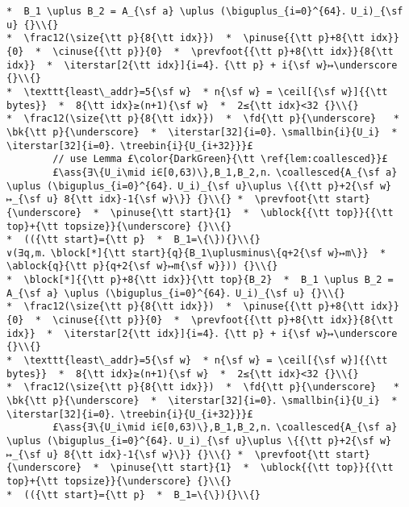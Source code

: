 \documentclass[10pt,twoside]{report}
\makeatletter
\newcommand{\ml}[2][t]{\mbox{\mdseries\begin{tabular}[#1]{@{}L@{}}#2\end{tabular}}}
\newcommand{\ass}[1]{\ensuremath{{\color{blue}\left\{\ml[c]{#1}\right\}}}}
\renewcommand{\ceil}[2][]{\left\lceil{#2}\right\rceil_{#1}}
\newcommand{\iterstar}[2][]{\text{\LARGE $*$}^{#1}_{#2}}
\makeatother
\begin{document}
\begin{lstlisting}
*  B_1 \uplus B_2 = A_{\sf a} \uplus (\biguplus_{i=0}^{64}．U_i)_{\sf u} {}\\{}
*  \frac12(\size{\tt p}{8{\tt idx}})  *  \pinuse{{\tt p}+8{\tt idx}}{0}  *  \cinuse{{\tt p}}{0}  *  \prevfoot{{\tt p}+8{\tt idx}}{8{\tt idx}}  *  \iterstar[2{\tt idx}]{i=4}．{\tt p} + i{\sf w}↦\underscore {}\\{}
*  \texttt{least\_addr}=5{\sf w}  * n{\sf w} = \ceil[{\sf w}]{{\tt bytes}}  *  8{\tt idx}≥(n+1){\sf w}  *  2≤{\tt idx}<32 {}\\{}
*  \frac12(\size{\tt p}{8{\tt idx}})  *  \fd{\tt p}{\underscore}   *  \bk{\tt p}{\underscore}  *  \iterstar[32]{i=0}．\smallbin{i}{U_i}  *  \iterstar[32]{i=0}．\treebin{i}{U_{i+32}}}£
        // use Lemma £\color{DarkGreen}{\tt \ref{lem:coallesced}}£ 
        £\ass{∃\{U_i\mid i∈[0,63)\},B_1,B_2,n．\coallesced{A_{\sf a} \uplus (\biguplus_{i=0}^{64}．U_i)_{\sf u}\uplus \{{\tt p}+2{\sf w}↦_{\sf u} 8{\tt idx}-1{\sf w}\}} {}\\{} *  \prevfoot{\tt start}{\underscore}  *  \pinuse{\tt start}{1}  *  \ublock{{\tt top}}{{\tt top}+{\tt topsize}}{\underscore} {}\\{}
*  (({\tt start}={\tt p}  *  B_1=\{\}){}\\{}
∨(∃q,m．\block[*]{\tt start}{q}{B_1\uplusminus\{q+2{\sf w}↦m\}}  *  \ablock{q}{\tt p}{q+2{\sf w}↦m{\sf w}})) {}\\{}
*  \block[*]{{\tt p}+8{\tt idx}}{\tt top}{B_2}  *  B_1 \uplus B_2 = A_{\sf a} \uplus (\biguplus_{i=0}^{64}．U_i)_{\sf u} {}\\{}
*  \frac12(\size{\tt p}{8{\tt idx}})  *  \pinuse{{\tt p}+8{\tt idx}}{0}  *  \cinuse{{\tt p}}{0}  *  \prevfoot{{\tt p}+8{\tt idx}}{8{\tt idx}}  *  \iterstar[2{\tt idx}]{i=4}．{\tt p} + i{\sf w}↦\underscore {}\\{}
*  \texttt{least\_addr}=5{\sf w}  * n{\sf w} = \ceil[{\sf w}]{{\tt bytes}}  *  8{\tt idx}≥(n+1){\sf w}  *  2≤{\tt idx}<32 {}\\{}
*  \frac12(\size{\tt p}{8{\tt idx}})  *  \fd{\tt p}{\underscore}   *  \bk{\tt p}{\underscore}  *  \iterstar[32]{i=0}．\smallbin{i}{U_i}  *  \iterstar[32]{i=0}．\treebin{i}{U_{i+32}}}£ 
        £\ass{∃\{U_i\mid i∈[0,63)\},B_1,B_2,n．\coallesced{A_{\sf a} \uplus (\biguplus_{i=0}^{64}．U_i)_{\sf u}\uplus \{{\tt p}+2{\sf w}↦_{\sf u} 8{\tt idx}-1{\sf w}\}} {}\\{} *  \prevfoot{\tt start}{\underscore}  *  \pinuse{\tt start}{1}  *  \ublock{{\tt top}}{{\tt top}+{\tt topsize}}{\underscore} {}\\{}
*  (({\tt start}={\tt p}  *  B_1=\{\}){}\\{}

\end{lstlisting}
\end{document}
